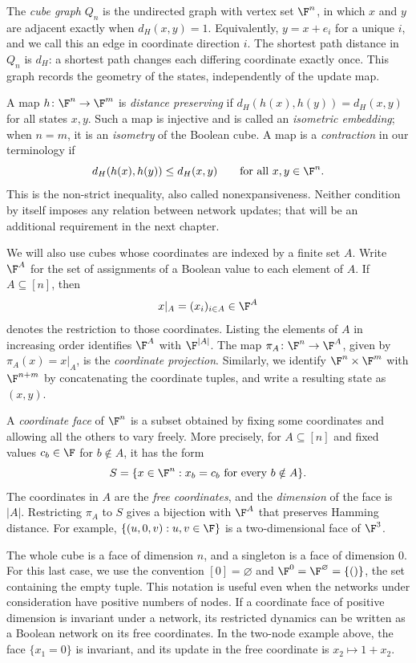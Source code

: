 The \emph{cube graph} $Q_n$ is the undirected graph with vertex set $\F^n$, in which $x$ and $y$ are adjacent exactly when $d_H(x,y)=1$. Equivalently, $y=x+e_i$ for a unique $i$, and we call this an edge in coordinate direction $i$. The shortest path distance in $Q_n$ is $d_H$: a shortest path changes each differing coordinate exactly once. This graph records the geometry of the states, independently of the update map.

A map $h\colon\F^n\to\F^m$ is \emph{distance preserving} if $d_H(h(x),h(y))=d_H(x,y)$ for all states $x,y$. Such a map is injective and is called an \emph{isometric embedding}; when $n=m$, it is an \emph{isometry} of the Boolean cube. A map is a \emph{contraction} in our terminology if
\[
    d_H(h(x),h(y))\leq d_H(x,y)
    \qquad\text{for all }x,y\in\F^n.
\]
This is the non-strict inequality, also called nonexpansiveness. Neither condition by itself imposes any relation between network updates; that will be an additional requirement in the next chapter.

We will also use cubes whose coordinates are indexed by a finite set $A$. Write $\F^A$ for the set of assignments of a Boolean value to each element of $A$. If $A\subseteq[n]$, then
\[
    x|_A=(x_i)_{i\in A}\in\F^A
\]
denotes the restriction to those coordinates. Listing the elements of $A$ in increasing order identifies $\F^A$ with $\F^{|A|}$. The map $\pi_A\colon\F^n\to\F^A$, given by $\pi_A(x)=x|_A$, is the \emph{coordinate projection}. Similarly, we identify $\F^n\times\F^m$ with $\F^{n+m}$ by concatenating the coordinate tuples, and write a resulting state as $(x,y)$.

A \emph{coordinate face} of $\F^n$ is a subset obtained by fixing some coordinates and allowing all the others to vary freely. More precisely, for $A\subseteq[n]$ and fixed values $c_b\in\F$ for $b\notin A$, it has the form
\[
    S=\{x\in\F^n:x_b=c_b\text{ for every }b\notin A\}.
\]
The coordinates in $A$ are the \emph{free coordinates}, and the \emph{dimension} of the face is $|A|$. Restricting $\pi_A$ to $S$ gives a bijection with $\F^A$ that preserves Hamming distance. For example, $\{(u,0,v):u,v\in\F\}$ is a two-dimensional face of $\F^3$.

The whole cube is a face of dimension $n$, and a singleton is a face of dimension $0$. For this last case, we use the convention $[0]=\varnothing$ and $\F^0=\F^\varnothing=\{()\}$, the set containing the empty tuple. This notation is useful even when the networks under consideration have positive numbers of nodes. If a coordinate face of positive dimension is invariant under a network, its restricted dynamics can be written as a Boolean network on its free coordinates. In the two-node example above, the face $\{x_1=0\}$ is invariant, and its update in the free coordinate is $x_2\mapsto1+x_2$.

